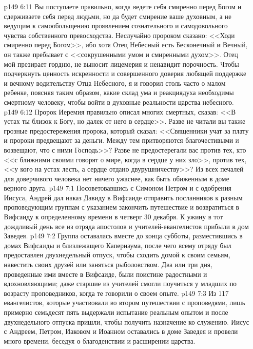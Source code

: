 \vs p149 6:11 Вы поступаете правильно, когда ведете себя смиренно перед Богом и сдерживаете себя перед людьми, но да будет смирение ваше духовным, а не ведущим к самообольщению проявлением сознательного и самодовольного чувства собственного превосходства. Неслучайно пророком сказано: <<Ходи смиренно перед Богом>>, ибо хотя Отец Небесный есть Бесконечный и Вечный, он также пребывает с <<сокрушенными умом и смиренными духом>>. Отец мой презирает гордню, не выносит лицемерия и ненавидит порочность. Чтобы подчеркнуть ценность искренности и совершенного доверия любящей поддержке и вечному водительству Отца Небесного, я и говорил столь часто о малом ребенке, поясняя таким образом, какие склад ума и реакциядуха необходимы смертному человеку, чтобы войти в духовные реальности царства небесного.
\vs p149 6:12 Пророк Иеремия правильно описал многих смертных, сказав: <<В устах ты близок к Богу, но далек от него в сердце>>. Разве не читали вы также грозные предостережения пророка, который сказал: <<Священники учат за плату и пророки предвещают за деньги. Между тем притворяются благочестивыми и возвещают, что с ними Господь>>? Разве не предостерегали вас против тех, кто <<с ближними своими говорят о мире, когда в сердце у них зло>>, против тех, <<у кого на устах лесть, а сердце отдано двурушничеству>>? Из всех печалей для доверчивого человека нет ничего ужаснее, как быть обиженным в доме верного друга.
\vs p149 7:1 Посоветовавшись с Симоном Петром и с одобрения Иисуса, Андрей дал наказ Давиду в Вифсаиде отправить посланников к разным проповедующим группам с указанием закончить путешествие и возвратиться в Вифсаиду к определенному времени в четверг 30 декабря. К ужину в тот дождливый день все из отряда апостолов и учителей\hyp{}евангелистов прибыли в дом Заведея.
\vs p149 7:2 Группа оставалась вместе до конца субботы, разместившись в домах Вифсаиды и близлежащего Капернаума, после чего всему отряду был предоставлен двухнедельный отпуск, чтобы сходить домой к своим семьям, навестить своих друзей или заняться рыболовством. Два или три дня, проведенные ими вместе в Вифсаиде, были поистине радостными и вдохновляющими; даже старшие из учителей смогли поучиться у младших по возрасту проповедников, когда те говорили о своем опыте.
\vs p149 7:3 Из 117 евангелистов, которые участвовали во втором путешествии с проповедями, лишь примерно семьдесят пять выдержали испытание реальным опытом и после двухнедельного отпуска пришли, чтобы получить назначение ко служению. Иисус с Андреем, Петром, Иаковом и Иоанном оставались в доме Заведея и провели много времени, беседуя о благоденствии и расширении царства.
